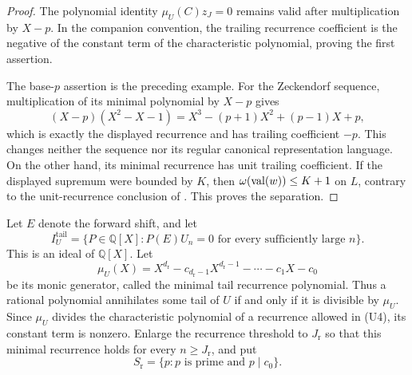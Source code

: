 \begin{proof}
  The polynomial identity \(\mu_U(C)z_J=0\) remains valid after
  multiplication by \(X-p\).  In the companion convention, the trailing
  recurrence coefficient is the negative of the constant term of the
  characteristic polynomial, proving the first assertion.

  The base-\(p\) assertion is the preceding example.  For the Zeckendorf
  sequence, multiplication of its minimal polynomial by \(X-p\) gives
  \[
    (X-p)(X^2-X-1)
      =X^3-(p+1)X^2+(p-1)X+p,
  \]
  which is exactly the displayed recurrence and has trailing coefficient
  \(-p\).  This changes neither the sequence nor its regular canonical
  representation language.  On the other hand, its minimal recurrence
  has unit trailing coefficient.  If the displayed supremum were bounded
  by \(K\), then
  \(\omega(\operatorname{val}(w))\le K+1\) on \(L\), contrary to the unit-recurrence
  conclusion of
  .  This proves the separation.
\end{proof}

Let \(E\) denote the forward shift, and let
\[
  I_U^{\mathrm{tail}}
    =\{P\in\mathbb Q[X]:P(E)U_n=0\text{ for every sufficiently large }n\}.
\]
This is an ideal of \(\mathbb Q[X]\). Let
\[
  \mu_U(X)=X^{d_{\mathrm r}}-c_{d_{\mathrm r}-1}X^{d_{\mathrm r}-1}
    -\cdots-c_1X-c_0
\]
be its monic generator, called the minimal tail recurrence polynomial.
Thus a rational polynomial annihilates some tail of \(U\) if and only if
it is divisible by \(\mu_U\). Since \(\mu_U\)
divides the characteristic polynomial of a recurrence allowed in
\textup{(U4)}, its constant term is nonzero. Enlarge the recurrence
threshold to \(J_{\mathrm r}\) so that this minimal recurrence holds for
every \(n\ge J_{\mathrm r}\), and put
\[
  S_{\mathrm r}=\{p:p\text{ is prime and }p\mid c_0\}.
\]
